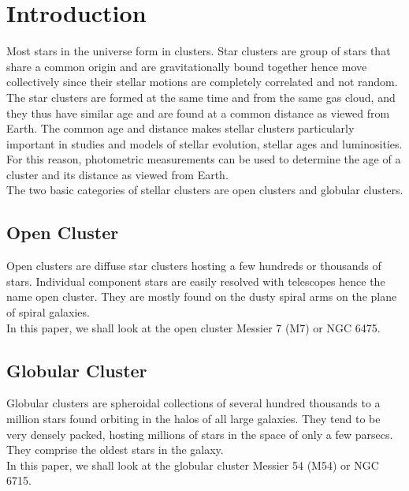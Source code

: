 \documentclass[12pt, twocolumn]{aastex62}
\begin{document}


\section{Introduction}
\label{sec:intro}

Most stars in the universe form in clusters. Star clusters are group of stars that share a common origin and are gravitationally bound together hence move collectively since their stellar motions are completely correlated and not random. The star clusters are formed at the same time and from the same gas cloud, and they thus have similar age and are found at a common distance as viewed from Earth. The common age and distance makes stellar clusters particularly important in studies and models of stellar evolution, stellar ages and luminosities. For this reason, photometric measurements can be used to determine the age of a cluster and its distance as viewed from Earth.\\
The two basic categories of stellar clusters are open clusters and globular clusters.\\

\subsection{Open Cluster}
Open clusters are diffuse star clusters hosting a few hundreds or thousands of stars. Individual component stars are easily resolved with telescopes hence the name open cluster. They are mostly found on the dusty spiral arms on the plane of spiral galaxies.\\
In this paper, we shall look at the open cluster Messier 7 (M7) or NGC 6475.


\subsection{Globular Cluster}
Globular clusters are spheroidal collections of several hundred thousands to a million stars found orbiting in the halos of all large galaxies. They tend to be very densely packed, hosting millions of stars in the space of only a few parsecs. They comprise the oldest stars in the galaxy.\\
In this paper, we shall look at the globular cluster Messier 54 (M54) or NGC 6715.
\end{document}
